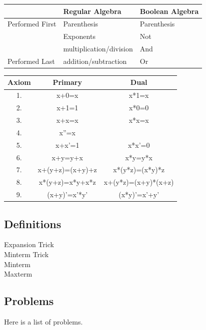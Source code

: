 \begin{tabular}[ht]{l|l|l}
			& Regular Algebra		& Boolean Algebra \\ \hline \hline
Performed First	& Parenthesis		& Parenthesis \\ \hline
			& Exponents			& Not  \\  \hline
			& multiplication/division & And \\  \hline
Performed Last	& addition/subtraction 	& Or \\
\end{tabular}

\vspace{0.2in}

\begin{tabular}[ht]{|c|c|c|}\hline
Axiom	&	Primary &	Dual	\\ \hline
1.	&	x+0=x	&	x*1=x	\\ \hline
2.	&	x+1=1	&	x*0=0	\\ \hline
3.	&	x+x=x	&	x*x=x	\\ \hline
4.	&	x''=x	&	     	\\ \hline
5.	&	x+x'=1	&	x*x'=0	\\ \hline
6.	&	x+y=y+x	&	x*y=y*x\\ \hline
7.	& x+(y+z)=(x+y)+z&x*(y*z)=(x*y)*z \\ \hline
8.	& x*(y+z)=x*y+x*z  & x+(y*z)=(x+y)*(x+z)  \\ \hline
9.	& (x+y)'=x'*y'  & (x*y)'=x'+y' \\ \hline
\end{tabular}


\subsection{Definitions}
\begin{description}
\item[Expansion Trick]
\item[Minterm Trick]
\item[Minterm]
\item[Maxterm]
\end{description}


\subsection{Problems}
Here is a list of problems.

